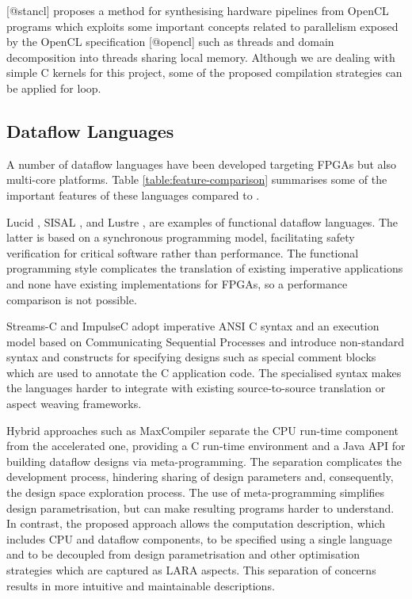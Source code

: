 [@stancl] proposes a method for synthesising hardware pipelines from
OpenCL programs which exploits some important concepts related to
parallelism exposed by the OpenCL specification [@opencl] such as
threads and domain decomposition into threads sharing local memory.
Although we are dealing with simple C kernels for this project, some
of the proposed compilation strategies can be applied for
loop.

\subsection{Dataflow Languages}
A number of dataflow languages have been developed targeting FPGAs but
also multi-core platforms. Table \ref{table:feature-comparison}
summarises some of the important features of these languages compared
to \FAST{}.

Lucid \cite{ashcroft1977lucid}, SISAL \cite{gurd1987implicit},
\cite{mcgraw1983sisal} and Lustre \cite{halbwachs1991synchronous}, are
examples of functional dataflow languages. The latter is based on a
synchronous programming model, facilitating safety verification for
critical software \cite{halbwachs1992programming} rather than
performance. The functional programming style complicates the
translation of existing imperative applications and none have existing
implementations for FPGAs, so a performance comparison is not
possible.

Streams-C\cite{Gokhale:Stone:Arnold:Kalinowski:2000} and
ImpulseC\cite{ImpulseC} adopt imperative ANSI C syntax and an
execution model based on Communicating Sequential Processes and
introduce non-standard syntax and constructs for specifying designs
such as special comment blocks which are used to annotate the C
application code. The specialised syntax makes the languages harder to
integrate with existing source-to-source translation or aspect weaving
frameworks.

Hybrid approaches such as MaxCompiler\cite{5719584} separate the CPU
run-time component from the accelerated one, providing a C run-time
environment and a Java API for building dataflow designs via
meta-programming. The separation complicates the development process,
hindering sharing of design parameters and, consequently, the design
space exploration process. The use of meta-programming simplifies
design parametrisation, but can make resulting programs harder to
understand. In contrast, the proposed approach allows the computation
description, which includes CPU and dataflow components, to be specified
using a single language and to be decoupled from design
parametrisation and other optimisation strategies which are captured
as LARA aspects. This separation of concerns results in more intuitive
and maintainable descriptions.

